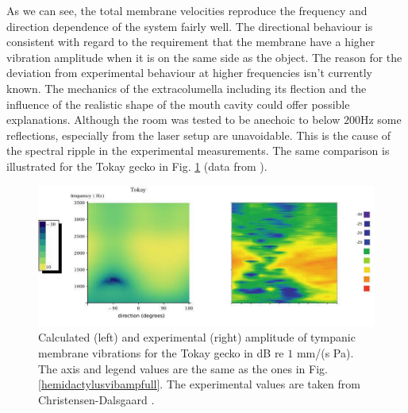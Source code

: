 As we can see, the total membrane velocities reproduce the frequency and direction dependence of the system fairly well. The directional behaviour is consistent with regard
to the requirement that the membrane have a higher vibration amplitude when it is on the same side as the object. The reason for the deviation from experimental behaviour at 
higher frequencies isn't currently known. The mechanics of the extracolumella including its flection and the influence of the realistic shape of the mouth cavity could offer possible explanations.
Although the room was tested to be anechoic to below $200$Hz some reflections, especially from
the laser setup are unavoidable. This is the cause of the spectral ripple in the experimental measurements. The same comparison is illustrated for the Tokay gecko in Fig. \ref{tokayvibampfull} (data from \cite{dalsgaardmanley1}).
\begin{figure}[ht!]
 \centering
 \includegraphics[width=1.0\linewidth]{Diagrams/Plots/tokayvibampfull.png}
 \caption[Vibration amplitude for the Tokay gecko]{Calculated (left) and experimental (right) amplitude of tympanic membrane vibrations for the Tokay gecko
 in dB re $1$ mm/(s Pa). The axis and legend values are the same as the ones in Fig. \ref{hemidactylusvibampfull}. The experimental values are taken from Christensen-Dalsgaard \cite{dalsgaardmanley1}.}
  \label{tokayvibampfull}
\end{figure}


